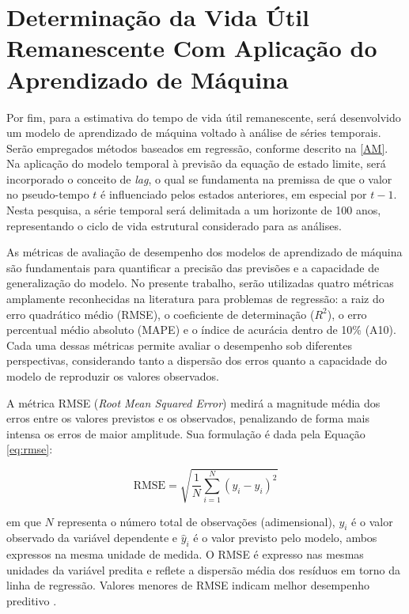 \section{Determinação da Vida Útil Remanescente Com Aplicação do Aprendizado de Máquina}

Por fim, para a estimativa do tempo de vida útil remanescente, será desenvolvido um modelo de aprendizado de máquina voltado à análise de séries temporais. Serão empregados métodos baseados em regressão, conforme descrito na \autoref{AM}. Na aplicação do modelo temporal à previsão da equação de estado limite, será incorporado o conceito de \textit{lag}, o qual se fundamenta na premissa de que o valor no pseudo-tempo $t$ é influenciado pelos estados anteriores, em especial por $t-1$. Nesta pesquisa, a série temporal será delimitada a um horizonte de 100 anos, representando o ciclo de vida estrutural considerado para as análises.

As métricas de avaliação de desempenho dos modelos de aprendizado de máquina são fundamentais para quantificar a precisão das previsões e a capacidade de generalização do modelo. No presente trabalho, serão utilizadas quatro métricas amplamente reconhecidas na literatura para problemas de regressão: a raiz do erro quadrático médio (RMSE), o coeficiente de determinação ($R^2$), o erro percentual médio absoluto (MAPE) e o índice de acurácia dentro de 10\% (A10). Cada uma dessas métricas permite avaliar o desempenho sob diferentes perspectivas, considerando tanto a dispersão dos erros quanto a capacidade do modelo de reproduzir os valores observados.

A métrica RMSE (\textit{Root Mean Squared Error}) medirá a magnitude média dos erros entre os valores previstos e os observados, penalizando de forma mais intensa os erros de maior amplitude. Sua formulação é dada pela Equação \eqref{eq:rmse}:

\begin{equation}
\mathrm{RMSE} = \sqrt{ \frac{1}{N} \sum_{i=1}^{N} (y_i - \hat y_i)^2 }
\label{eq:rmse}
\end{equation}

em que $N$ representa o número total de observações (adimensional), $y_i$ é o valor observado da variável dependente e $\hat{y}_i$ é o valor previsto pelo modelo, ambos expressos na mesma unidade de medida. O RMSE é expresso nas mesmas unidades da variável predita e reflete a dispersão média dos resíduos em torno da linha de regressão. Valores menores de RMSE indicam melhor desempenho preditivo \cite{montgomery_design_2020, nguyen_prediction_2022}.

